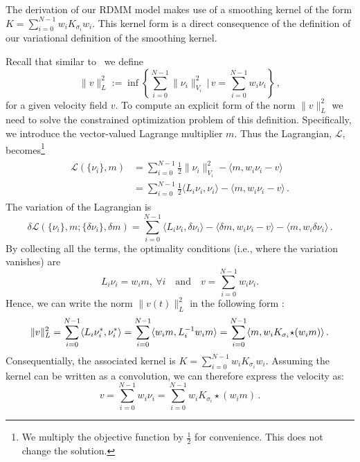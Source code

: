 \documentclass{article}
\numberwithin{equation}{section}
\newcommand{\ie}{{i.e.}}
\newcommand{\zy}[1]{{\color{black}{#1}}}
\begin{document}
The derivation of our RDMM model makes use of a smoothing kernel of the form $K=\sum_{i=0}^{N-1} w_i K_{\sigma_i}w_i$. This kernel form is a direct consequence of the definition of our variational definition of the smoothing kernel. 

Recall that similar to~\citep{niethammer2019_cvpr} we define
\begin{equation}
\|v \|^2_L := \inf \left\{ \sum_{i=0}^{N-1} \|\nu_i \|^2_{V_i}\,| \, v = \sum_{i=0}^{N-1} w_i \nu_i \right\}\,,
\end{equation}
for a given velocity field $v$. To compute an explicit form of the norm $\|v\|_L^2$ we need to solve the constrained optimization problem of this definition. Specifically, we introduce the vector-valued Lagrange multiplier $m$. Thus the Lagrangian, $\mathcal{L}$, becomes\footnote{We multiply the objective function by $\frac{1}{2}$ for convenience. This does not change the solution.}
\begin{align}
    \begin{split}
         \mathcal{L}(\{\nu_i\},m)  &=  \sum_{i=0}^{N-1} \frac 12\|\nu_i\|_{V_i}^2 - \langle m, w_i \nu_i -v \rangle\\
         & = \sum_{i=0}^{N-1} \frac 12 \langle L_i \nu_i,\nu_i \rangle - \langle m,  w_i\nu_i-v\rangle\,.
    \end{split}
\end{align}
The variation of the Lagrangian is
\begin{equation}
         \delta \mathcal{L}
(\{\nu_i\},m;\{\delta \nu_i\},\delta m) = \sum_{i=0}^{N-1}\langle L_i \nu_i,\delta \nu_i \rangle - \langle \delta m,  w_i\nu_i-v\rangle-\langle m,  w_i \delta \nu_i\rangle\,.
\end{equation}
By collecting all the terms, the optimality conditions (\ie, where the variation vanishes) are 
\begin{equation}
    L_i\nu_i=w_i m,~\forall i \quad\text{and}\quad v = \sum_{i=0}^{N-1} w_i\nu_i.
\end{equation}
Hence, we can write the norm $\|v(t) \|^2_L$ in the following form :
\begin{equation}
        \|v \|^2_L  =\sum_{i=0}^{N-1} \langle L_i \nu_i^*, \nu_i^* \rangle
        = \sum_{i=0}^{N-1} \langle w_i m, L_i^{-1} w_i m\rangle
        = \sum_{i=0}^{N-1} \langle m, w_i K_{\sigma_i} \zy{\star(w_i m)}\rangle \,.
\end{equation}
Consequentially, the associated kernel is $K = \sum_{i=0}^{N-1} w_i K_{\sigma_i} w_i$. Assuming the kernel can be written as a convolution, we can therefore express the velocity as:
\begin{equation}
v=\sum_{i=0}^{N-1} w_i \nu_i =  \sum_{i=0}^{N-1} w_{i} K_{\sigma_i} \star (w_{i}m)\,.
\end{equation}
\end{document}
